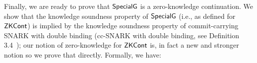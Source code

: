 


\noindent Finally, we are ready to prove that ${\mathsf{SpecialG}}$ is a zero-knowledge continuation. We show that the knowledge soundness property 
of ${\mathsf{SpecialG}}$ (i.e., as defined for ${\mathsf{ZKCont}}$) is implied by the knowledge soundness property of commit-carrying SNARK with double 
binding (cc-SNARK with double binding, see Definition 3.4~\cite{LegoSNARK}); our notion of zero-knowledge for ${\mathsf{ZKCont}}$ is, in fact a 
new and stronger notion so we prove that directly. Formally, we have: 

